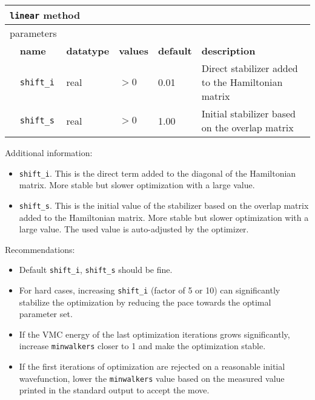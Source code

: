 \begin{table}[h]
\begin{center}
\begin{tabularx}{\textwidth}{l l l l l l }
\hline
\multicolumn{6}{l}{\texttt{linear} method} \\
\hline
\multicolumn{2}{l}{parameters}  & \multicolumn{4}{l}{}\\
   &   \bfseries name     & \bfseries datatype & \bfseries values & \bfseries default   & \bfseries description \\
   &   \texttt{shift\_i} &  real     & $>0$ & 0.01 & Direct stabilizer added to the Hamiltonian matrix\\
   &   \texttt{shift\_s} &  real     & $>0$ & 1.00 & Initial stabilizer based on the overlap matrix\\
  \hline
\end{tabularx}
\end{center}
\end{table}

Additional information:
\begin{itemize}
\item \texttt{shift\_i}. This is the direct term added to the diagonal of the Hamiltonian matrix.
                         More stable but slower optimization with a large value.
\item \texttt{shift\_s}. This is the initial value of the stabilizer based on the overlap matrix added to the Hamiltonian matrix. 
                         More stable but slower optimization with a large value. The used value is auto-adjusted by the optimizer.
\end{itemize}


Recommendations:
\begin{itemize}
  \item Default \texttt{shift\_i}, \texttt{shift\_s} should be fine.
  \item For hard cases, increasing \texttt{shift\_i} (factor of 5 or 10) can significantly stabilize the optimization by reducing the pace towards the optimal parameter set.
  \item If the VMC energy of the last optimization iterations grows significantly, increase \texttt{minwalkers} closer to 1 and make the optimization stable.
  \item If the first iterations of optimization are rejected on a reasonable initial wavefunction, 
        lower the \texttt{minwalkers} value based on the measured value printed in the standard output to accept the move.
\end{itemize}

